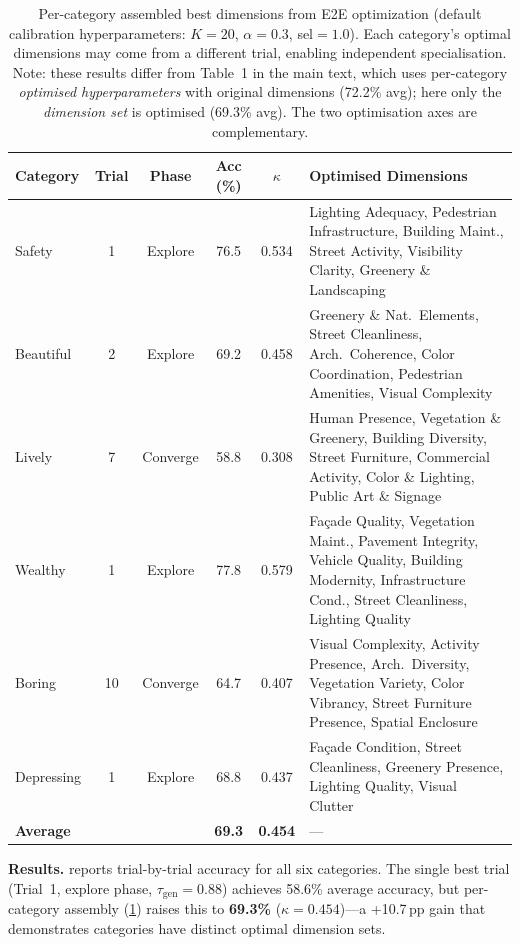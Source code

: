 \documentclass[runningheads]{llncs}
\begin{document}
\begin{table}[H]
\centering
\caption{Per-category assembled best dimensions from E2E optimization (default calibration hyperparameters: $K{=}20$, $\alpha{=}0.3$, sel${=}1.0$). Each category's optimal dimensions may come from a different trial, enabling independent specialisation. Note: these results differ from Table~1 in the main text, which uses per-category \emph{optimised hyperparameters} with original dimensions (72.2\% avg); here only the \emph{dimension set} is optimised (69.3\% avg). The two optimisation axes are complementary.}
\label{tab:e2e_assembly}
\small
\begin{tabular}{lccccp{5.6cm}}
\toprule
Category & Trial & Phase & Acc (\%) & $\kappa$ & Optimised Dimensions \\
\midrule
Safety & 1 & Explore & 76.5 & 0.534 & Lighting Adequacy, Pedestrian Infrastructure, Building Maint., Street Activity, Visibility Clarity, Greenery \& Landscaping \\
Beautiful & 2 & Explore & 69.2 & 0.458 & Greenery \& Nat.\ Elements, Street Cleanliness, Arch.\ Coherence, Color Coordination, Pedestrian Amenities, Visual Complexity \\
Lively & 7 & Converge & 58.8 & 0.308 & Human Presence, Vegetation \& Greenery, Building Diversity, Street Furniture, Commercial Activity, Color \& Lighting, Public Art \& Signage \\
Wealthy & 1 & Explore & 77.8 & 0.579 & Fa\c{c}ade Quality, Vegetation Maint., Pavement Integrity, Vehicle Quality, Building Modernity, Infrastructure Cond., Street Cleanliness, Lighting Quality \\
Boring & 10 & Converge & 64.7 & 0.407 & Visual Complexity, Activity Presence, Arch.\ Diversity, Vegetation Variety, Color Vibrancy, Street Furniture Presence, Spatial Enclosure \\
Depressing & 1 & Explore & 68.8 & 0.437 & Fa\c{c}ade Condition, Street Cleanliness, Greenery Presence, Lighting Quality, Visual Clutter \\
\midrule
\multicolumn{3}{l}{\textbf{Average}} & \textbf{69.3} & \textbf{0.454} & --- \\
\bottomrule
\end{tabular}
\end{table}

\smallskip\noindent\textbf{Results.}
 reports trial-by-trial accuracy for all six categories.
The single best trial (Trial~1, explore phase, $\tau_{\mathrm{gen}}{=}0.88$) achieves 58.6\% average accuracy, but per-category assembly (\cref{tab:e2e_assembly}) raises this to \textbf{69.3\%} ($\kappa{=}0.454$)---a +10.7\,pp gain that demonstrates categories have distinct optimal dimension sets.
\end{document}
